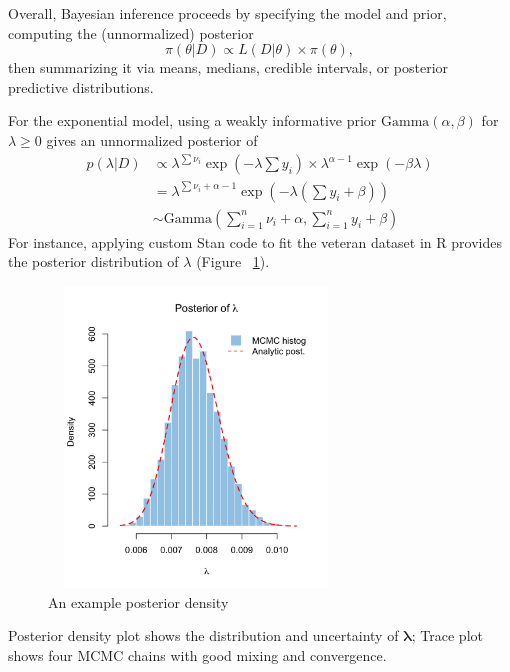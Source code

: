 Overall, Bayesian inference proceeds by specifying the model and prior, computing the (unnormalized) posterior
$$
\pi(\theta | D)
\propto
L(D | \theta) \times \pi(\theta),
$$
then summarizing it via means, medians, credible intervals, or posterior predictive distributions.

For the exponential model, using a weakly informative prior $\text{Gamma}(\alpha, \beta)$ for $\lambda \ge 0$ gives an unnormalized posterior of 
\begin{align*}
p(\lambda|D)
&\propto
\lambda^{\sum \nu_i}
\exp(-\lambda \sum y_i)
\times
\lambda^{\alpha - 1}
\exp(-\beta \lambda)\\
&=\lambda^{\sum \nu_i + \alpha - 1}
\exp \left( - \lambda (\sum y_i + \beta) \right)\\
&\sim
\text{Gamma}
\left(
\sum_{i=1}^{n} \nu_i + \alpha,
\sum_{i=1}^{n} y_i + \beta
\right)
\end{align*}
For instance, applying custom Stan code to fit the veteran dataset in R provides the posterior distribution of $\lambda$ (Figure ~\ref{fig:exp veteran}).

\begin{figure}[H]
    \centering
    \includegraphics[height=8cm, width=0.7\textwidth]{MSc_Statistics_Research_Report_paper/images/直方图.png}
    \caption{An example posterior density}
    \label{fig:exp veteran}
\end{figure}
Posterior density plot shows the distribution and uncertainty of $\boldsymbol{\lambda}$; Trace plot shows four MCMC chains with good mixing and convergence.








